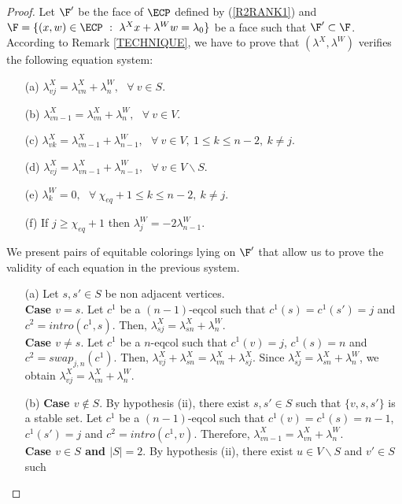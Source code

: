 \begin{proof}
Let $\F'$ be the face of $\ECP$ defined by (\ref{R2RANK1}) and
$\F = \{ (x,w) \in \ECP ~:~ \lambda^X x + \lambda^W w = \lambda_0\}$ be a face such that $\F' \subset \F$.
According to Remark \ref{TECHNIQUE}, we have to prove that $(\lambda^X, \lambda^W)$ verifies the following equation system: 
\begin{enumerate}
\item[(a)] $\lambda^X_{vj} = \lambda^X_{vn} + \lambda^W_n,~~~ \forall~ v \in S$.
\item[(b)] $\lambda^X_{vn-1} = \lambda^X_{vn} + \lambda^W_n,~~~ \forall~ v \in V$.
\item[(c)] $\lambda^X_{vk} = \lambda^X_{vn-1} + \lambda^W_{n-1},~~~
                   \forall~ v \in V,~ 1 \leq k \leq n-2,~ k \neq j$.
\item[(d)] $\lambda^X_{vj} = \lambda^X_{vn-1} + \lambda^W_{n-1},~~~
                                            \forall~ v \in V \backslash S$.
\item[(e)] $\lambda^W_k = 0,~~~ \forall~ \chi_{eq} + 1 \leq k \leq n-2,~ k \neq j$.
\item[(f)] If $j \geq \chi_{eq} + 1$ then $\lambda^W_j = - 2 \lambda^W_{n-1}$.
\end{enumerate}
We present pairs of equitable colorings lying on $\F'$ that allow us to
prove the validity of each equation in the previous system.
\begin{enumerate}
\item[(a)] Let $s, s' \in S$ be non adjacent vertices.\\
\textbf{Case $v = s$}. Let $c^1$ be a $(n-1)$-eqcol such that $c^1(s) = c^1(s') = j$ and
$c^2 = intro(c^1,s)$. Then, $\lambda^X_{sj} = \lambda^X_{sn} + \lambda^W_n$.\\
\textbf{Case $v \neq s$}. 
Let $c^1$ be a $n$-eqcol such that $c^1(v) = j$, $c^1(s) = n$ and $c^2 = swap_{j,n}(c^1)$. Then, 
$\lambda^X_{vj} + \lambda^X_{sn} = \lambda^X_{vn} + \lambda^X_{sj}$. Since $\lambda^X_{sj} = \lambda^X_{sn} + \lambda^W_n$, we obtain $\lambda^X_{vj} = \lambda^X_{vn} + \lambda^W_n$.
\item[(b)] \textbf{Case $v \notin S$}. 
By hypothesis (ii), there exist $s, s' \in S$ such that $\{v, s, s'\}$ is a stable set.
Let $c^1$ be a $(n-1)$-eqcol such that $c^1(v) = c^1(s) = n-1$, $c^1(s') = j$ and
$c^2 = intro(c^1,v)$. Therefore, $\lambda^X_{vn-1} = \lambda^X_{vn} + \lambda^W_n$.\\
\textbf{Case $v \in S$ and $|S| = 2$}. By hypothesis (ii), there exist $u \in V \backslash S$ and $v' \in S$ such

\end{enumerate}
\end{proof}
